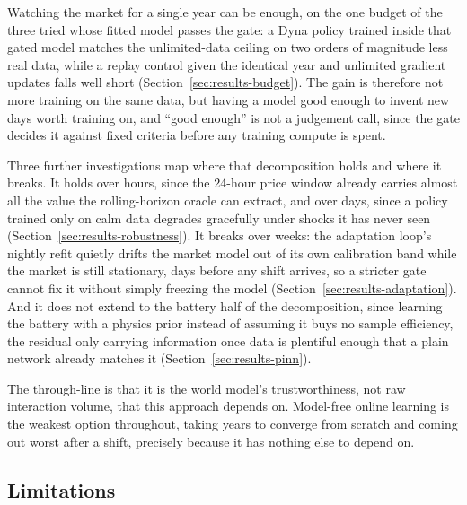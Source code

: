 \documentclass[conference]{IEEEtran}
\begin{document}
Watching the market for a single year can be enough, on the one budget of the three tried whose fitted model passes the gate: a Dyna policy trained inside that gated model matches the unlimited-data ceiling on two orders of magnitude less real data, while a replay control given the identical year and unlimited gradient updates falls well short (Section~\ref{sec:results-budget}). The gain is therefore not more training on the same data, but having a model good enough to invent new days worth training on, and ``good enough'' is not a judgement call, since the gate decides it against fixed criteria before any training compute is spent.

Three further investigations map where that decomposition holds and where it breaks. It holds over hours, since the 24-hour price window already carries almost all the value the rolling-horizon oracle can extract, and over days, since a policy trained only on calm data degrades gracefully under shocks it has never seen (Section~\ref{sec:results-robustness}). It breaks over weeks: the adaptation loop's nightly refit quietly drifts the market model out of its own calibration band while the market is still stationary, days before any shift arrives, so a stricter gate cannot fix it without simply freezing the model (Section~\ref{sec:results-adaptation}). And it does not extend to the battery half of the decomposition, since learning the battery with a physics prior instead of assuming it buys no sample efficiency, the residual only carrying information once data is plentiful enough that a plain network already matches it (Section~\ref{sec:results-pinn}).

The through-line is that it is the world model's trustworthiness, not raw interaction volume, that this approach depends on. Model-free online learning is the weakest option throughout, taking years to converge from scratch and coming out worst after a shift, precisely because it has nothing else to depend on.

\subsection{Limitations}
\label{sec:limitations}
\end{document}
